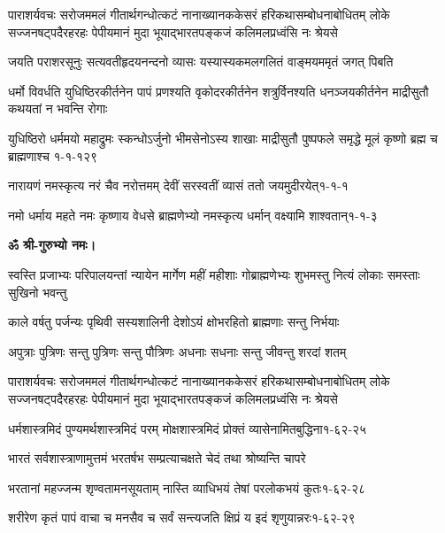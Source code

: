 \fourlineindentedshloka
{पाराशर्यवचः सरोजममलं गीतार्थगन्धोत्कटं}
{नानाख्यानककेसरं हरिकथासम्बोधनाबोधितम्}
{लोके सज्जनषट्पदैरहरहः पेपीयमानं मुदा}
{भूयाद्भारतपङ्कजं कलिमलप्रध्वंसि नः श्रेयसे}

\twolineshloka
{जयति पराशरसूनुः सत्यवतीहृदयनन्दनो व्यासः}
{यस्यास्यकमलगलितं वाङ्मयममृतं जगत् पिबति}


\fourlineindentedshloka
{धर्मो विवर्धति युधिष्ठिरकीर्तनेन}
{पापं प्रणश्यति वृकोदरकीर्तनेन}
{शत्रुर्विनश्यति धनञ्जयकीर्तनेन}
{माद्रीसुतौ कथयतां न भवन्ति रोगाः}

\annofourlineindentedshloka
{युधिष्ठिरो धर्ममयो महाद्रुमः}
{स्कन्धोऽर्जुनो भीमसेनोऽस्य शाखाः}
{माद्रीसुतौ पुष्पफले समृद्धे}
{मूलं कृष्णो ब्रह्म च ब्राह्मणाश्च}
{१-१-१२९}

\annotwolineshloka
{नारायणं नमस्कृत्य नरं चैव नरोत्तमम्}
{देवीं सरस्वतीं व्यासं ततो जयमुदीरयेत्}{१-१-१}

\annotwolineshloka
{नमो धर्माय महते नमः कृष्णाय वेधसे}
{ब्राह्मणेभ्यो नमस्कृत्य धर्मान् वक्ष्यामि शाश्वतान्}{१-१-३}


\resetShloka
\centerline{\textbf{ॐ श्री-गुरुभ्यो नमः।}}

\resetShloka
{}

\fourlineindentedshloka
{स्वस्ति प्रजाभ्यः परिपालयन्तां}
{न्यायेन मार्गेण महीं महीशाः}
{गोब्राह्मणेभ्यः शुभमस्तु नित्यं}
{लोकाः समस्ताः सुखिनो भवन्तु}

\twolineshloka
{काले वर्षतु पर्जन्यः पृथिवी सस्यशालिनी}
{देशोऽयं क्षोभरहितो ब्राह्मणाः सन्तु निर्भयाः}

\twolineshloka
{अपुत्राः पुत्रिणः सन्तु पुत्रिणः सन्तु पौत्रिणः}
{अधनाः सधनाः सन्तु जीवन्तु शरदां शतम्}

\fourlineindentedshloka
{पाराशर्यवचः सरोजममलं गीतार्थगन्धोत्कटं}
{नानाख्यानककेसरं हरिकथासम्बोधनाबोधितम्}
{लोके सज्जनषट्पदैरहरहः पेपीयमानं मुदा}
{भूयाद्भारतपङ्कजं कलिमलप्रध्वंसि नः श्रेयसे}



\annotwolineshloka
{धर्मशास्त्रमिदं पुण्यमर्थशास्त्रमिदं परम्}
{मोक्षशास्त्रमिदं प्रोक्तं व्यासेनामितबुद्धिना}{१-६२-२५}

\twolineshloka
{भारतं सर्वशास्त्राणामुत्तमं भरतर्षभ}
{सम्प्रत्याचक्षते चेदं तथा श्रोष्यन्ति चापरे}

\annotwolineshloka
{भरतानां महज्जन्म शृण्वतामनसूयताम्}
{नास्ति व्याधिभयं तेषां परलोकभयं कुतः}{१-६२-२८}

\annotwolineshloka
{शरीरेण कृतं पापं वाचा च मनसैव च}
{सर्वं सन्त्यजति क्षिप्रं य इदं शृणुयान्नरः}{१-६२-२९}

